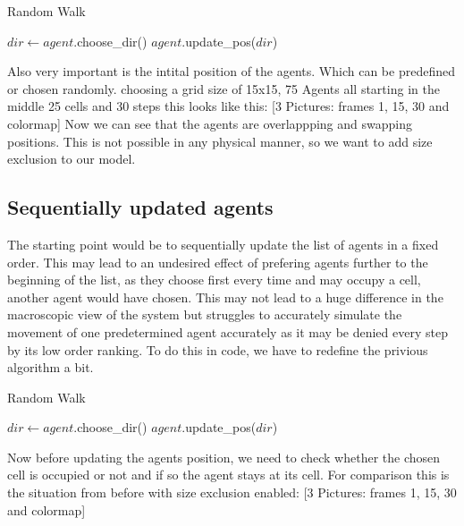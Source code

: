 \begin{algorithm}
\caption{Random Walk}\label{RW}
\begin{algorithmic}[1]
      \State $dir \gets agent.$choose\_dir()
      \State $agent.$update\_pos($dir$)
   \EndFor
\EndFor
\EndProcedure
\end{algorithmic}
\end{algorithm}

Also very important is the intital position of the agents. Which can be predefined or chosen randomly. 
choosing a grid size of 15x15, 75 Agents all starting in the middle 25 cells and 30 steps this looks like this: 
[3 Pictures: frames 1, 15, 30 and colormap]
Now we can see that the agents are overlappping and swapping positions.
This is not possible in any physical manner, so we want to add size exclusion to our model.

\subsection{Sequentially updated agents}
The starting point would be to sequentially update the list of agents in a fixed order. 
This may lead to an undesired effect of prefering agents further to the beginning of the list, 
as they choose first every time and may occupy a cell, another agent would have chosen. 
This may not lead to a huge difference in the macroscopic view of the system but struggles to accurately 
simulate the movement of one predetermined agent accurately as it may be denied every step by its low order ranking.
To do this in code, we have to redefine the privious algorithm a bit. 

\begin{algorithm}
\caption{Random Walk}\label{RW_SE}
\begin{algorithmic}[1]
      \State $dir \gets agent.$choose\_dir()
         \State $agent.$update\_pos($dir$)
      \EndIf
   \EndFor
\EndFor
\EndProcedure
\end{algorithmic}
\end{algorithm}

Now before updating the agents position, 
we need to check whether the chosen cell is occupied or not and if so the agent stays at its cell.
For comparison this is the situation from before with size exclusion enabled:
[3 Pictures: frames 1, 15, 30 and colormap] 

